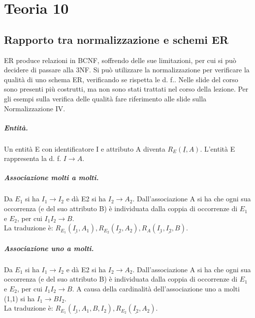 \chapter{Teoria 10}

\section{Rapporto tra normalizzazione e schemi ER}

ER produce relazioni in BCNF, soffrendo delle sue limitazioni, per cui si può decidere di passare alla 3NF. Si può utilizzare la normalizzazione per verificare la qualità di uno schema ER, verificando se rispetta le d. f.. Nelle slide del corso sono presenti più costrutti, ma non sono stati trattati nel corso della lezione. Per gli esempi sulla verifica delle qualità fare riferimento alle slide sulla Normalizzazione IV.

\paragraph{Entità.} Un entità E con identificatore I e attributo A diventa $R_E(\underline{I}, A)$. L'entità E rappresenta la d. f. $I \rightarrow A$.

\paragraph{Associazione molti a molti.} Da $E_1$ si ha $I_1 \rightarrow I_2$ e dà E2 si ha $I_2 \rightarrow A_2$. Dall'associazione A si ha che ogni sua occorrenza (e del suo attributo B) è individuata dalla coppia di occorrenze di $E_1$ e $E_2$, per cui $I_1 I_2 \rightarrow B$.\\ La traduzione è: $R_{E_1}(\underline{I_1}, A_1), R_{E_2}(\underline{I_2}, A_2), R_{A}(\underline{I_1}, \underline{I_2}, B)$.

\paragraph{Associazione uno a molti.} Da $E_1$ si ha $I_1 \rightarrow I_2$ e dà E2 si ha $I_2 \rightarrow A_2$.  Dall'associazione A si ha che ogni sua occorrenza (e del suo attributo B) è individuata dalla coppia di occorrenze di $E_1$ e $E_2$, per cui $I_1 I_2 \rightarrow B$. A causa della cardinalità dell'associazione uno a molti (1,1) si ha $I_1 \rightarrow B I_2$. \\La traduzione è: $R_{E_1}(\underline{I_1}, A_1, B, I_2), R_{E_2}(\underline{I_2}, A_2)$.

